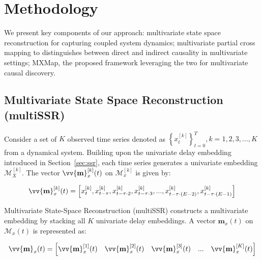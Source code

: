 \section{Methodology}
\label{sec:method}
We present key components of our approach: multivariate state space reconstruction for capturing coupled system dynamics; multivariate partial cross mapping to distinguishes between direct and indirect causality in multivariate settings; MXMap, the proposed framework leveraging the two for multivariate causal discovery.

\subsection{Multivariate State Space Reconstruction (multiSSR)}
\label{sec:multi-ssr}

Consider a set of $K$ observed time series denoted as $\left\{ x^{[k]}_{t} \right\}_{t=0}^{T},  k=1, 2, 3, ..., K$ from a dynamical system. Building upon the univariate delay embedding introduced in Section~\ref{sec:ssr}, each time series generates a univariate embedding $\mathcal{M}_{X}^{[k]}$. The vector $\vv{\textbf{m}}_{x}^{[k]}(t)$ on $\mathcal{M}_{x}^{[k]}$ is given by:

\begin{equation}
    \vv{\textbf{m}}_{x}^{[k]}(t)= \left[x_{t}^{[k]},  x^{[k]}_{t-\tau},  x^{[k]}_{t-\tau\cdot2},  x^{[k]}_{t-\tau\cdot3},  ...,  x^{[k]}_{t-\tau\cdot\left(E-2\right)},  x^{[k]}_{t-\tau\cdot\left(E-1\right)}\right]
\end{equation}


Multivariate State-Space Reconstruction (multiSSR) constructs a multivariate embedding by stacking all $K$ univariate delay embeddings. A vector $\textbf{m}_{x}(t)$ on $\mathcal{M}_{x}(t)$ is represented as:

\begin{equation}
    \vv{\textbf{m}}_{x}(t)= \left[ \vv{\textbf{m}}_{x}^{[1]}(t) \ \ \   \vv{\textbf{m}}_{x}^{[2]}(t) \ \ \     \vv{\textbf{m}}_{x}^{[3]}(t) \ \ \    ... \ \ \   \vv{\textbf{m}}_{x}^{[K]}(t)\right]
\end{equation}


